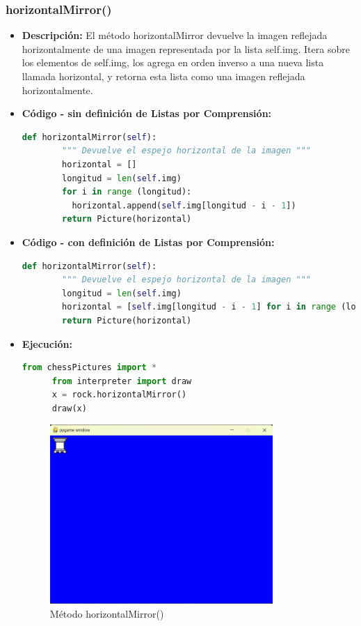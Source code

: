 \documentclass{article}
\begin{document}
  \subsubsection{horizontalMirror()}
  \begin{itemize}
    \item \textbf{Descripción: } El método horizontalMirror devuelve la imagen reflejada horizontalmente 
      de una imagen representada por la lista self.img. Itera sobre los elementos de self.img, los agrega en 
      orden inverso a una nueva lista llamada horizontal, y retorna esta lista como una imagen reflejada horizontalmente.
    \item \textbf{Código - sin definición de Listas por Comprensión:}
    \begin{lstlisting}[language=Python, caption=Método horizontalMirror()]
      def horizontalMirror(self):
        """ Devuelve el espejo horizontal de la imagen """
        horizontal = []
        longitud = len(self.img)
        for i in range (longitud):
          horizontal.append(self.img[longitud - i - 1])
        return Picture(horizontal)
    \end{lstlisting}
    \newpage
    \item \textbf{Código - con definición de Listas por Comprensión:}
    \begin{lstlisting}[language=Python, caption=Método horizontalMirror()]
      def horizontalMirror(self):
        """ Devuelve el espejo horizontal de la imagen """
        longitud = len(self.img)
        horizontal = [self.img[longitud - i - 1] for i in range (longitud)]
        return Picture(horizontal)
    \end{lstlisting}
    \item \textbf{Ejecución:}
    \begin{lstlisting}[language=Python, caption=Prueba de horizontalMirror()]
      from chessPictures import *
      from interpreter import draw
      x = rock.horizontalMirror()
      draw(x)
    \end{lstlisting}
    \begin{figure}[H]
      \centering
      \includegraphics[width=0.8\textwidth, keepaspectratio]{img/horizontal.png}
      \caption{Método horizontalMirror()}
    \end{figure}
  \end{itemize}
  
\end{document}
